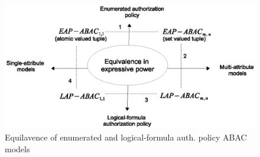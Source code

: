  
 	\begin{figure} 
 		\centering
 		\includegraphics[width=.9\textwidth]{DBSEC16/all-equivalence}
 		\caption{Equilavence of enumerated and logical-formula auth. policy ABAC models}
 		\label{fig:all-equivalence}
 	\end{figure}
 